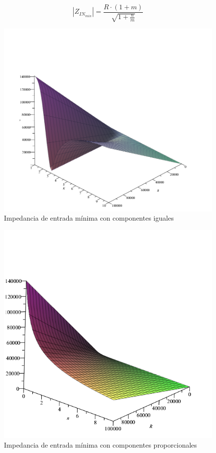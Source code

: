 \begin{equation}
    |Z_{IN_{min}}| = \frac{R \cdot (1 + m)}{\sqrt{1 + \frac{n}{m}}}
    \label{eq:impedancia_minima_componentes_proporcionales}
\end{equation}

\begin{figure}[H]
    \centering
    \includegraphics[scale=0.45]{../EJ1/Recursos/impedancia_entrada_componentes_iguales.png}
    \caption{Impedancia de entrada m\'inima con componentes iguales}
\end{figure}

\begin{figure}[H]
    \centering
    \includegraphics[scale=0.7]{../EJ1/Recursos/impedancia_entrada_componentes_proporcionales.png}
    \caption{Impedancia de entrada m\'inima con componentes proporcionales}
\end{figure}

